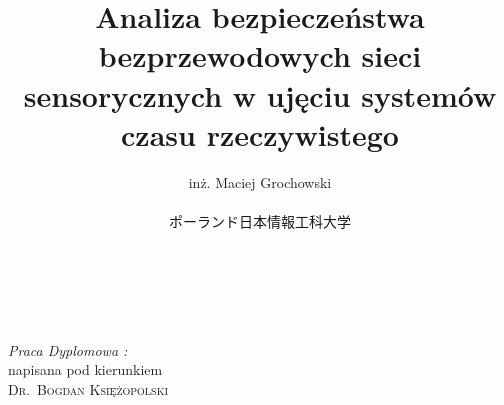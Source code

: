 \documentclass[11pt]{article}
\begin{document}
\begin{CJK*}{UTF8}{min}

\title{ Analiza bezpieczeństwa bezprzewodowych sieci sensorycznych w ujęciu systemów czasu rzeczywistego\\}
\author{inż. Maciej Grochowski \\
\\
ポーランド日本情報工科大学}
\maketitle 

\mbox{}\\
\mbox{}\\

\begin{flushright}
\emph{Praca Dyplomowa :} \\
napisana pod kierunkiem \\
 \textsc{ Dr.~Bogdan Księżopolski}
\end{flushright}







\clearpage 


	

	
	
	
	
	
	
	
	
	
	
	
	
	
	
	
	
	



\end{CJK*}	
\end{document}
